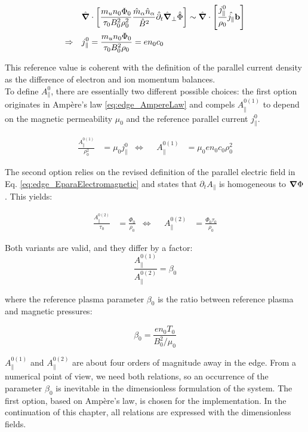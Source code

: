 \begin{align}
	&&&\hat{\grad}\cdot\left[\frac{m_un_0\Phi_0}{\tau_0B_0^2\rho_0^2}\frac{\hat{m}_\alpha \hat{n}_\alpha}{ \hat{B}^2}\hat{\partial}_t\hat{\grad}_\perp\hat{\Phi}\right] \sim \hat{\grad}\cdot\left[\frac{j_\parallel^0}{\rho_0}\hat{j_\parallel}\mathbf{b}\right] \nonumber \\
	\Rightarrow&&& j_\parallel^0 = \frac{m_un_0\Phi_0}{\tau_0B_0^2\rho_0} = en_0c_0
\end{align}

This reference value is coherent with the definition of the parallel current density as the difference of electron and ion momentum balances. \\

To define $A_\parallel^0$, there are essentially two different possible choices: the first option originates in Ampère's law \ref{eq:edge_AmpereLaw} and compels $A_\parallel^{0(1)}$ to depend on the magnetic permeability $\mu_0$ and the reference parallel current $j_\parallel^0$.

\begin{align}
	\label{eq:FirstOptionApara0}
	\frac{A_\parallel^{0(1)}}{\rho_0^2} &= \mu_0j_\parallel^0 &\Leftrightarrow&& A_\parallel^{0(1)} &= \mu_0en_0c_0\rho_0^2
\end{align}

The second option relies on the revised definition of the parallel electric field in Eq. \ref{eq:edge_EparaElectromagnetic} and states that $\partial_tA_\parallel$ is homogeneous to $\grad\Phi$. This yields:

\begin{align}
	\label{eq:SecondOptionApara0}
	\frac{A_\parallel^{0(2)}}{\tau_0} &= \frac{\Phi_0}{\rho_0} &\Leftrightarrow&& A_\parallel^{0(2)} &= \frac{\Phi_0\tau_0}{\rho_0}
\end{align}

Both variants are valid, and they differ by a factor:
\begin{equation}
	\frac{A_\parallel^{0(1)}}{A_\parallel^{0(2)}} = \beta_0
\end{equation}

where the reference plasma parameter $\beta_0$ is the ratio between reference plasma and magnetic pressures:
 
\begin{equation}
	\beta_0 = \frac{en_0T_0}{B_0^2 / \mu_0}
\end{equation}

$A_\parallel^{0(1)}$ and $A_\parallel^{0(2)}$ are about four orders of magnitude away in the edge. From a numerical point of view, we need both relations, so an occurrence of the parameter $\beta_0$ is inevitable in the dimensionless formulation of the system. The first option, based on Ampère's law, is chosen for the implementation. In the continuation of this chapter, all relations are expressed with the dimensionless fields.

